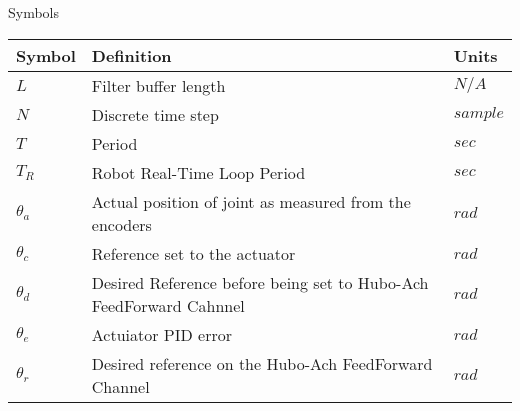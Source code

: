 \Large
\centering
Symbols\\
\normalsize
\begin{longtable}{p{} | p{} | p{}}
\hline
Symbol     & Definition                                                         & Units \\
\hline
$L$        & Filter buffer length                                               & $N/A$\\
\hline
$N$        & Discrete time step                                                 & $sample$\\
\hline
$T$        & Period                                                             & $sec$ \\
\hline
$T_R$        & Robot Real-Time Loop Period                                      & $sec$ \\
\hline
$\theta_a$ & Actual position of joint as measured from the encoders             & $rad$ \\
\hline
$\theta_c$ & Reference set to the actuator                                      & $rad$ \\
\hline
$\theta_d$ & Desired Reference before being set to Hubo-Ach FeedForward Cahnnel & $rad$ \\
\hline
$\theta_e$ & Actuiator PID error                                                & $rad$ \\
\hline
$\theta_r$ & Desired reference on the Hubo-Ach FeedForward Channel              & $rad$ \\
\hline

\end{longtable}
